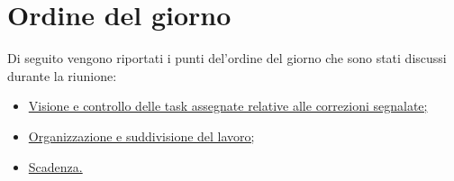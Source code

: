\clearpage
\section{Ordine del giorno}
Di seguito vengono riportati i punti del’ordine del giorno che sono stati discussi durante la riunione:
\begin{itemize}
	\item \hyperref[sec:visione_controllo]{Visione e controllo delle task assegnate relative alle correzioni segnalate;}
	\item \hyperref[sec:organizzazione]{Organizzazione e suddivisione del lavoro;}
	\item \hyperref[sec:scadenza]{Scadenza.}
\end{itemize}